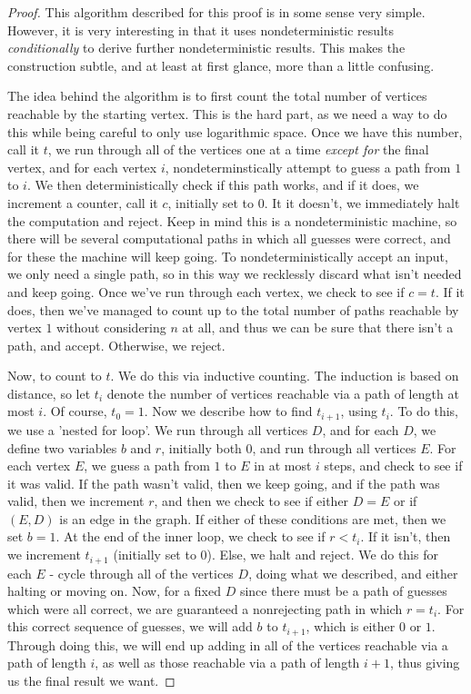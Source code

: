 \begin{proof}
    This algorithm described for this proof is in some sense very simple. However, it is very interesting in that it uses nondeterministic results \textit{conditionally} to derive further nondeterministic results. This makes the construction subtle, and at least at first glance, more than a little confusing. 
    \par The idea behind the algorithm is to first count the total number of vertices reachable by the starting vertex. This is the hard part, as we need a way to do this while being careful to only use logarithmic space. Once we have this number, call it $t$, we run through all of the vertices one at a time \textit{except for} the final vertex, and for each vertex $i$, nondeterminstically attempt to guess a path from $1$ to $i$. We then deterministically check if this path works, and if it does, we increment a counter, call it $c$, initially set to $0$. It it doesn't, we immediately halt the computation and reject. Keep in mind this is a nondeterministic machine, so there will be several computational paths in which all guesses were correct, and for these the machine will keep going. To nondeterministically accept an input, we only need a single path, so in this way we recklessly discard what isn't needed and keep going. Once we've run through each vertex, we check to see if $c = t$. If it does, then we've managed to count up to the total number of paths reachable by vertex $1$ without considering $n$ at all, and thus we can be sure that there isn't a path, and accept. Otherwise, we reject. 
    \par Now, to count to $t$. We do this via inductive counting. The induction is based on distance, so let $t_i$ denote the number of vertices reachable via a path of length at most $i$. Of course, $t_0 = 1$. Now we describe how to find $t_{i+1}$, using $t_i$. To do this, we use a 'nested for loop'. We run through all vertices $D$, and for each $D$, we define two variables $b$ and $r$, initially both $0$, and run through all vertices $E$. For each vertex $E$, we guess a path from $1$ to $E$ in at most $i$ steps, and check to see if it was valid. If the path wasn't valid, then we keep going, and if the path was valid, then we increment $r$, and then we check to see if either $D = E$ or if $(E,D)$ is an edge in the graph. If either of these conditions are met, then we set $b=1$. At the end of the inner loop, we check to see if $r < t_i$. If it isn't, then we increment $t_{i+1}$ (initially set to $0$). Else, we halt and reject. We do this for each $E$ - cycle through all of the vertices $D$, doing what we described, and either halting or moving on. Now, for a fixed $D$ since there must be a path of guesses which were all correct, we are guaranteed a nonrejecting path in which $r = t_i$. For this correct sequence of guesses, we will add $b$ to $t_{i+1}$, which is either $0$ or $1$. Through doing this, we will end up adding in all of the vertices reachable via a path of length $i$, as well as those reachable via a path of length $i+1$, thus giving us the final result we want. 

\end{proof}
